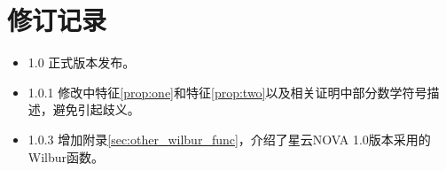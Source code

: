 \section{修订记录}
\begin{itemize}
\item{1.0} 正式版本发布。
\item{1.0.1} 修改中特征\ref{prop:one}和特征\ref{prop:two}以及相关证明中部分数学符号描述，避免引起歧义。
\item{1.0.3} 增加附录\ref{sec:other_wilbur_func}，介绍了星云NOVA 1.0版本采用的Wilbur函数。
\end{itemize}
